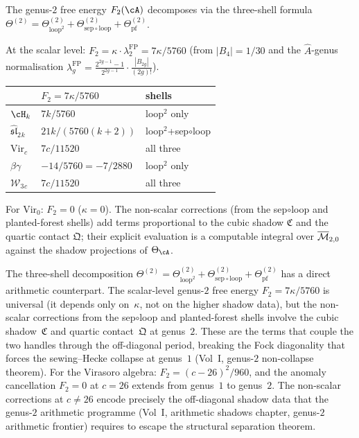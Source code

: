\begin{computation}
\label{comp:genus2-partition-function}
The genus-$2$ free energy $F_2(\cA)$ decomposes via the
three-shell formula
$\Theta^{(2)}=\Theta^{(2)}_{\mathrm{loop}^2}
+\Theta^{(2)}_{\mathrm{sep}\circ\mathrm{loop}}
+\Theta^{(2)}_{\mathrm{pf}}$.

At the scalar level:
$F_2=\kappa\cdot\lambda_2^{\mathrm{FP}}=7\kappa/5760$
(from $|B_4|=1/30$ and the $\hat{A}$-genus normalisation
$\lambda_g^{\mathrm{FP}} = \tfrac{2^{2g-1}-1}{2^{2g-1}}
\cdot\tfrac{|B_{2g}|}{(2g)!}$).

\begin{center}
\renewcommand{\arraystretch}{1.2}
\begin{tabular}{lll}
& $F_2=7\kappa/5760$ & shells \\
\hline
$\cH_k$ & $7k/5760$ & loop$^2$ only \\
$\widehat{\mathfrak{sl}}_2{}_k$
 & $21k/(5760(k{+}2))$
 & loop$^2$+sep$\circ$loop \\
$\mathrm{Vir}_c$ & $7c/11520$
 & all three \\
$\beta\gamma$ & $-14/5760=-7/2880$ & loop$^2$ only \\
$\mathcal W_3{}_c$ & $7c/11520$
 & all three
\end{tabular}
\end{center}
For $\mathrm{Vir}_{0}$: $F_2=0$ ($\kappa=0$).
The non-scalar corrections (from the sep$\circ$loop and
planted-forest shells) add terms proportional to the cubic
shadow $\mathfrak C$ and the quartic contact $\mathfrak Q$;
their explicit evaluation is a computable integral over
$\overline{\mathcal M}_{2,0}$ against the shadow projections of
$\Theta_\cA$.
\end{computation}

\begin{remark}%
\label{rem:genus2-pf-arithmetic}%
%
The three-shell decomposition
$\Theta^{(2)} = \Theta^{(2)}_{\mathrm{loop}^2}
+ \Theta^{(2)}_{\mathrm{sep}\circ\mathrm{loop}}
+ \Theta^{(2)}_{\mathrm{pf}}$
has a direct arithmetic counterpart. The scalar-level
genus-$2$ free energy $F_2 = 7\kappa/5760$ is universal
(it depends only on~$\kappa$, not on the higher shadow
data), but the non-scalar corrections from the
sep$\circ$loop and planted-forest shells involve the cubic
shadow~$\mathfrak{C}$ and quartic contact~$\mathfrak{Q}$
at genus~$2$. These are the terms that couple the two
handles through the off-diagonal period, breaking the
Fock diagonality that forces the sewing--Hecke collapse at
genus~$1$ (Vol~I, genus-$2$ non-collapse theorem).
For the Virasoro algebra: $F_2 = (c{-}26)^2/960$, and the
anomaly cancellation $F_2 = 0$ at $c = 26$ extends from
genus~$1$ to genus~$2$. The non-scalar corrections at
$c \neq 26$ encode precisely the off-diagonal shadow data
that the genus-$2$ arithmetic programme
(Vol~I, arithmetic shadows chapter,
genus-$2$ arithmetic frontier)
requires to escape the structural separation theorem.
\end{remark}

